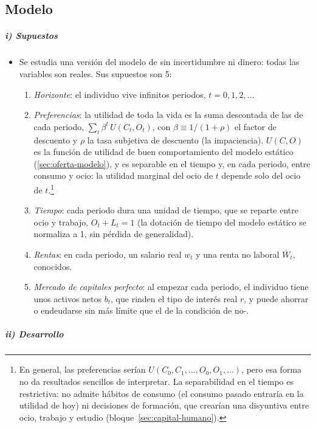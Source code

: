 \documentclass[11pt]{article}
\begin{document}
\subsection{Modelo}\label{sec:lr-modelo}

\subparagraph{i) Supuestos}

\begin{itemize}
\item Se estudia una versión del modelo de \textcite{LucasRapping1969Real} sin incertidumbre ni dinero: todas las variables son reales. Sus supuestos son 5:
  \begin{enumerate}
  \item \emph{Horizonte}: el individuo vive infinitos periodos, $t=0,1,2,\dots$
  \item \emph{Preferencias}: la utilidad de toda la vida es la suma descontada de las de cada periodo, $\sum_t\beta^t\,U(C_t,O_t)$, con $\beta\equiv 1/(1+\rho)$ el factor de descuento y $\rho$ la tasa subjetiva de descuento (la impaciencia). $U(C,O)$ es la función de utilidad de buen comportamiento del modelo estático (\ref{sec:oferta-modelo}), y es separable en el tiempo y, en cada periodo, entre consumo y ocio: la utilidad marginal del ocio de $t$ depende solo del ocio de $t$.\footnote{En general, las preferencias serían $U(C_0,C_1,\dots,O_0,O_1,\dots)$, pero esa forma no da resultados sencillos de interpretar. La separabilidad en el tiempo es restrictiva: no admite hábitos de consumo (el consumo pasado entraría en la utilidad de hoy) ni decisiones de formación, que crearían una disyuntiva entre ocio, trabajo y estudio (bloque~\ref{sec:capital-humano}).}
  \item \emph{Tiempo}: cada periodo dura una unidad de tiempo, que se reparte entre ocio y trabajo, $O_t+L_t=1$ (la dotación de tiempo del modelo estático se normaliza a 1, sin pérdida de generalidad).
  \item \emph{Rentas}: en cada periodo, un salario real $w_t$ y una renta no laboral $\overline{W}_t$, conocidos.
  \item \emph{Mercado de capitales perfecto}: al empezar cada periodo, el individuo tiene unos activos netos $b_t$, que rinden el tipo de interés real $r$, y puede ahorrar o endeudarse sin más límite que el de la condición de no-.
  \end{enumerate}
\end{itemize}

\subparagraph{ii) Desarrollo}
\end{document}
